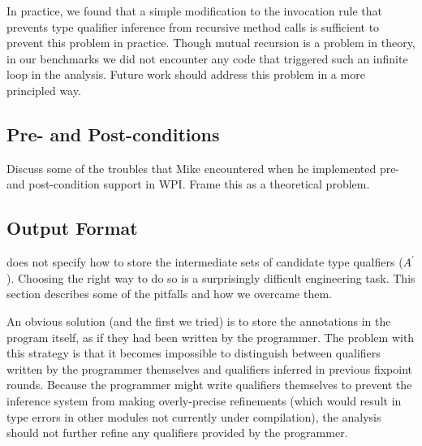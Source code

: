 In practice, we found that a simple modification to the invocation rule that
prevents type qualifier inference from recursive method calls is sufficient
to prevent this problem in practice. Though mutual recursion is a problem in
theory, in our benchmarks we did not encounter any code that triggered such
an infinite loop in the analysis. Future work should address this problem in
a more principled way.

\subsection{Pre- and Post-conditions}
\label{sec:pre-post-conditions}

Discuss some of the troubles that Mike encountered when
he implemented pre- and post-condition support in WPI. Frame
this as a theoretical problem. 

\subsection{Output Format}
\label{sec:output}


 does not specify how to store the intermediate
sets of candidate type qualfiers (\ie $A^{\prime}$). Choosing the right way
to do so is a surprisingly difficult engineering task. This section describes some
of the pitfalls and how we overcame them.

An obvious solution (and the first we tried) is to store the annotations
in the program itself, as if they had been written by the programmer. The
problem with this strategy is that it becomes impossible to distinguish
between qualifiers written by the programmer themselves and qualifiers
inferred in previous fixpoint rounds. Because the programmer might write
qualifiers themselves to prevent the inference system from making overly-precise
refinements (which would result in type errors in \eg other modules not currently
under compilation), the analysis should not further refine any qualifiers
provided by the programmer.

